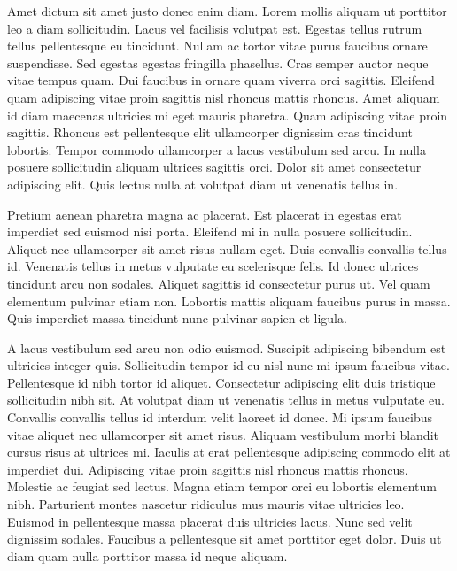 \documentclass[12pt]{article}
\begin{document}
\begin{multicols*}{2}
    Amet dictum sit amet justo donec enim diam. Lorem mollis aliquam ut porttitor leo a diam sollicitudin. Lacus vel facilisis volutpat est. Egestas tellus rutrum tellus pellentesque eu tincidunt. Nullam ac tortor vitae purus faucibus ornare suspendisse. Sed egestas egestas fringilla phasellus. Cras semper auctor neque vitae tempus quam. Dui faucibus in ornare quam viverra orci sagittis. Eleifend quam adipiscing vitae proin sagittis nisl rhoncus mattis rhoncus. Amet aliquam id diam maecenas ultricies mi eget mauris pharetra. Quam adipiscing vitae proin sagittis. Rhoncus est pellentesque elit ullamcorper dignissim cras tincidunt lobortis. Tempor commodo ullamcorper a lacus vestibulum sed arcu. In nulla posuere sollicitudin aliquam ultrices sagittis orci. Dolor sit amet consectetur adipiscing elit. Quis lectus nulla at volutpat diam ut venenatis tellus in.

    Pretium aenean pharetra magna ac placerat. Est placerat in egestas erat imperdiet sed euismod nisi porta. Eleifend mi in nulla posuere sollicitudin. Aliquet nec ullamcorper sit amet risus nullam eget. Duis convallis convallis tellus id. Venenatis tellus in metus vulputate eu scelerisque felis. Id donec ultrices tincidunt arcu non sodales. Aliquet sagittis id consectetur purus ut. Vel quam elementum pulvinar etiam non. Lobortis mattis aliquam faucibus purus in massa. Quis imperdiet massa tincidunt nunc pulvinar sapien et ligula.

    A lacus vestibulum sed arcu non odio euismod. Suscipit adipiscing bibendum est ultricies integer quis. Sollicitudin tempor id eu nisl nunc mi ipsum faucibus vitae. Pellentesque id nibh tortor id aliquet. Consectetur adipiscing elit duis tristique sollicitudin nibh sit. At volutpat diam ut venenatis tellus in metus vulputate eu. Convallis convallis tellus id interdum velit laoreet id donec. Mi ipsum faucibus vitae aliquet nec ullamcorper sit amet risus. Aliquam vestibulum morbi blandit cursus risus at ultrices mi. Iaculis at erat pellentesque adipiscing commodo elit at imperdiet dui. Adipiscing vitae proin sagittis nisl rhoncus mattis rhoncus. Molestie ac feugiat sed lectus. Magna etiam tempor orci eu lobortis elementum nibh. Parturient montes nascetur ridiculus mus mauris vitae ultricies leo. Euismod in pellentesque massa placerat duis ultricies lacus. Nunc sed velit dignissim sodales. Faucibus a pellentesque sit amet porttitor eget dolor. Duis ut diam quam nulla porttitor massa id neque aliquam.


\end{multicols*}
\end{document}
